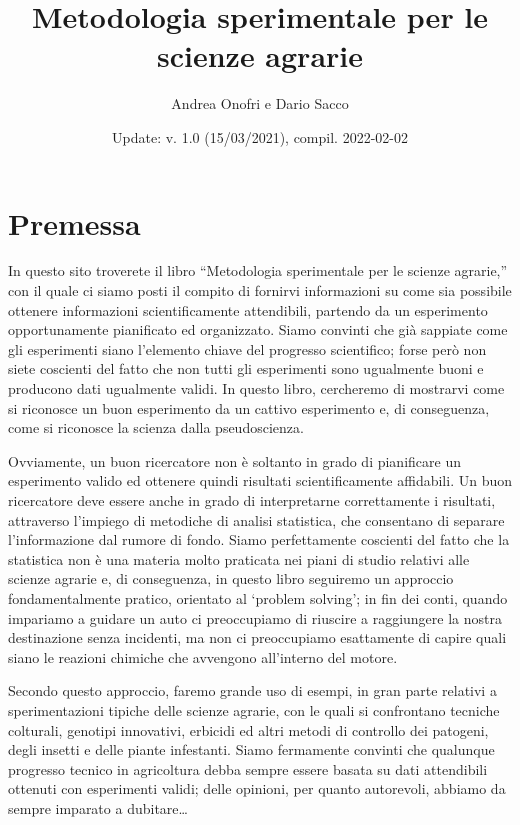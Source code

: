 \documentclass[a4paper,12pt,oneside]{book}
\author{Andrea Onofri e Dario Sacco}
\date{Update: v. 1.0 (15/03/2021), compil. 2022-02-02}
\title{Metodologia sperimentale per le scienze agrarie}
\subtitle{}
\begin{document}
\maketitle
\tableofcontents

\hypertarget{premessa}{%
\chapter*{Premessa}\label{premessa}}

In questo sito troverete il libro ``Metodologia sperimentale per le scienze agrarie,'' con il quale ci siamo posti il compito di fornirvi informazioni su come sia possibile ottenere informazioni scientificamente attendibili, partendo da un esperimento opportunamente pianificato ed organizzato. Siamo convinti che già sappiate come gli esperimenti siano l'elemento chiave del progresso scientifico; forse però non siete coscienti del fatto che non tutti gli esperimenti sono ugualmente buoni e producono dati ugualmente validi. In questo libro, cercheremo di mostrarvi come si riconosce un buon esperimento da un cattivo esperimento e, di conseguenza, come si riconosce la scienza dalla pseudoscienza.

Ovviamente, un buon ricercatore non è soltanto in grado di pianificare un esperimento valido ed ottenere quindi risultati scientificamente affidabili. Un buon ricercatore deve essere anche in grado di interpretarne correttamente i risultati, attraverso l'impiego di metodiche di analisi statistica, che consentano di separare l'informazione dal rumore di fondo. Siamo perfettamente coscienti del fatto che la statistica non è una materia molto praticata nei piani di studio relativi alle scienze agrarie e, di conseguenza, in questo libro seguiremo un approccio fondamentalmente pratico, orientato al `problem solving'; in fin dei conti, quando impariamo a guidare un auto ci preoccupiamo di riuscire a raggiungere la nostra destinazione senza incidenti, ma non ci preoccupiamo esattamente di capire quali siano le reazioni chimiche che avvengono all'interno del motore.

Secondo questo approccio, faremo grande uso di esempi, in gran parte relativi a sperimentazioni tipiche delle scienze agrarie, con le quali si confrontano tecniche colturali, genotipi innovativi, erbicidi ed altri metodi di controllo dei patogeni, degli insetti e delle piante infestanti. Siamo fermamente convinti che qualunque progresso tecnico in agricoltura debba sempre essere basata su dati attendibili ottenuti con esperimenti validi; delle opinioni, per quanto autorevoli, abbiamo da sempre imparato a dubitare\ldots{}
\end{document}
